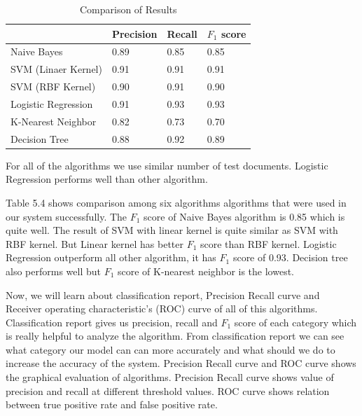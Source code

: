 \documentclass[12pt,a4paper]{report}
\begin{document}
\begin{table}[h!]
\begin{center}
\caption{Comparison of Results}
\begin{tabular}{|m{6.8cm} | m{2cm}| m{2cm}| m{2cm}|}
\hline
     & Precision & Recall & $F_1$ score \\
\hline
    Naive Bayes & 0.89 & 0.85 & 0.85\\
\hline 
    SVM (Linaer Kernel) & 0.91 & 0.91 & 0.91\\
\hline 
    SVM (RBF Kernel) & 0.90 & 0.91 & 0.90\\
\hline 
    Logistic Regression & 0.91 & 0.93 & 0.93\\
\hline
    K-Nearest Neighbor & 0.82 & 0.73 & 0.70\\
\hline
    Decision Tree & 0.88 & 0.92 & 0.89\\
\hline
\end{tabular}
\end{center}
\end{table}
\noindent
For all of the algorithms we use similar number of test documents. Logistic Regression performs well than other algorithm.
\par
\vspace{0.5cm}
\noindent
Table 5.4 shows comparison among six algorithms algorithms that were used in our system successfully. The $F_1$ score of Naive Bayes algorithm is 0.85 which is quite well. The result of SVM with linear kernel is quite similar as SVM with RBF kernel. But Linear kernel has better $F_1$ score than RBF kernel. Logistic Regression outperform all other algorithm, it has $F_1$ score of 0.93. Decision tree also performs well but $F_1$ score of K-nearest neighbor is the lowest.

\par
\vspace{0.5cm}
\noindent
Now, we will learn about classification report, Precision Recall curve and Receiver operating characteristic's (ROC) curve of  all of this algorithms. Classification report gives us precision, recall and $F_1$ score of each category which is really helpful to analyze the algorithm. From classification report we can see what category our model can can more accurately and what should we do to increase the accuracy of the system. Precision Recall curve and ROC curve shows the graphical evaluation of algorithms. Precision Recall curve shows value of precision and recall at different threshold values. ROC curve shows relation between true positive rate and false positive rate. 
\clearpage
\end{document}
